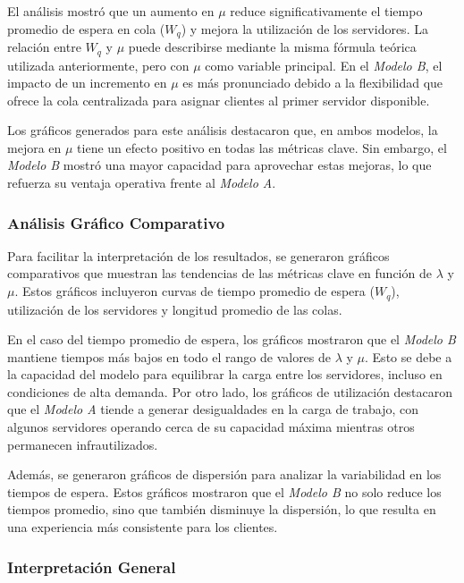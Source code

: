 \documentclass[a4paper,12pt]{article}
\begin{document}
El análisis mostró que un aumento en \( \mu \) reduce significativamente el tiempo promedio de espera en cola (\( W_q \)) y mejora la utilización de los servidores. La relación entre \( W_q \) y \( \mu \) puede describirse mediante la misma fórmula teórica utilizada anteriormente, pero con \( \mu \) como variable principal. En el \textit{Modelo B}, el impacto de un incremento en \( \mu \) es más pronunciado debido a la flexibilidad que ofrece la cola centralizada para asignar clientes al primer servidor disponible.

Los gráficos generados para este análisis destacaron que, en ambos modelos, la mejora en \( \mu \) tiene un efecto positivo en todas las métricas clave. Sin embargo, el \textit{Modelo B} mostró una mayor capacidad para aprovechar estas mejoras, lo que refuerza su ventaja operativa frente al \textit{Modelo A}.

\subsubsection{Análisis Gráfico Comparativo}

Para facilitar la interpretación de los resultados, se generaron gráficos comparativos que muestran las tendencias de las métricas clave en función de \( \lambda \) y \( \mu \). Estos gráficos incluyeron curvas de tiempo promedio de espera (\( W_q \)), utilización de los servidores y longitud promedio de las colas. 

En el caso del tiempo promedio de espera, los gráficos mostraron que el \textit{Modelo B} mantiene tiempos más bajos en todo el rango de valores de \( \lambda \) y \( \mu \). Esto se debe a la capacidad del modelo para equilibrar la carga entre los servidores, incluso en condiciones de alta demanda. Por otro lado, los gráficos de utilización destacaron que el \textit{Modelo A} tiende a generar desigualdades en la carga de trabajo, con algunos servidores operando cerca de su capacidad máxima mientras otros permanecen infrautilizados.

Además, se generaron gráficos de dispersión para analizar la variabilidad en los tiempos de espera. Estos gráficos mostraron que el \textit{Modelo B} no solo reduce los tiempos promedio, sino que también disminuye la dispersión, lo que resulta en una experiencia más consistente para los clientes.

\subsubsection{Interpretación General}
\end{document}
